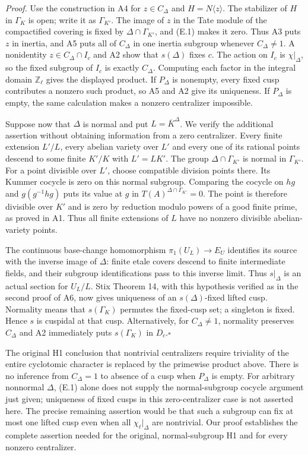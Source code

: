 \documentclass[11pt,a4paper]{article}
\begin{document}
\emph{Proof.} Use the construction in A4 for $z\in C_\Delta$ and $H=N\langle z\rangle$. The stabilizer of $H$ in $\Gamma_K$ is open; write it as $\Gamma_{K'}$. The image of $z$ in the Tate module of the compactified covering is fixed by $\Delta\cap\Gamma_{K'}$, and (E.1) makes it zero. Thus A3 puts $z$ in inertia, and A5 puts all of $C_\Delta$ in one inertia subgroup whenever $C_\Delta\ne1$. A nonidentity $z\in C_\Delta\cap I_c$ and A2 show that $s(\Delta)$ fixes $c$. The action on $I_c$ is $\chi|_\Delta$, so the fixed subgroup of $I_c$ is exactly $C_\Delta$. Computing each factor in the integral domain $\mathbb Z_\ell$ gives the displayed product. If $P_\Delta$ is nonempty, every fixed cusp contributes a nonzero such product, so A5 and A2 give its uniqueness. If $P_\Delta$ is empty, the same calculation makes a nonzero centralizer impossible.

Suppose now that $\Delta$ is normal and put $L=\overline K^{\Delta}$. We verify the additional assertion without obtaining information from a zero centralizer. Every finite extension $L'/L$, every abelian variety over $L'$ and every one of its rational points descend to some finite $K'/K$ with $L'=LK'$. The group $\Delta\cap\Gamma_{K'}$ is normal in $\Gamma_{K'}$. For a point divisible over $L'$, choose compatible division points there. Its Kummer cocycle is zero on this normal subgroup. Comparing the cocycle on $hg$ and $g(g^{-1}hg)$ puts its value at $g$ in $T(A)^{\Delta\cap\Gamma_{K'}}=0$. The point is therefore divisible over $K'$ and is zero by reduction modulo powers of a good finite prime, as proved in A1. Thus all finite extensions of $L$ have no nonzero divisible abelian-variety points.

The continuous base-change homomorphism $\pi_1(U_L)\to E_U$ identifies its source with the inverse image of $\Delta$: finite etale covers descend to finite intermediate fields, and their subgroup identifications pass to this inverse limit. Thus $s|_\Delta$ is an actual section for $U_L/L$. Stix Theorem 14, with this hypothesis verified as in the second proof of A6, now gives uniqueness of an $s(\Delta)$-fixed lifted cusp. Normality means that $s(\Gamma_K)$ permutes the fixed-cusp set; a singleton is fixed. Hence $s$ is cuspidal at that cusp. Alternatively, for $C_\Delta\ne1$, normality preserves $C_\Delta$ and A2 immediately puts $s(\Gamma_K)$ in $D_c$.\hfill$\square$

The original H1 conclusion that nontrivial centralizers require triviality of the entire cyclotomic character is replaced by the primewise product above. There is no inference from $C_\Delta=1$ to absence of a cusp when $P_\Delta$ is empty. For arbitrary nonnormal $\Delta$, (E.1) alone does not supply the normal-subgroup cocycle argument just given; uniqueness of fixed cusps in this zero-centralizer case is not asserted here. The precise remaining assertion would be that such a subgroup can fix at most one lifted cusp even when all $\chi_\ell|_\Delta$ are nontrivial. Our proof establishes the complete assertion needed for the original, normal-subgroup H1 and for every nonzero centralizer.
\end{document}
